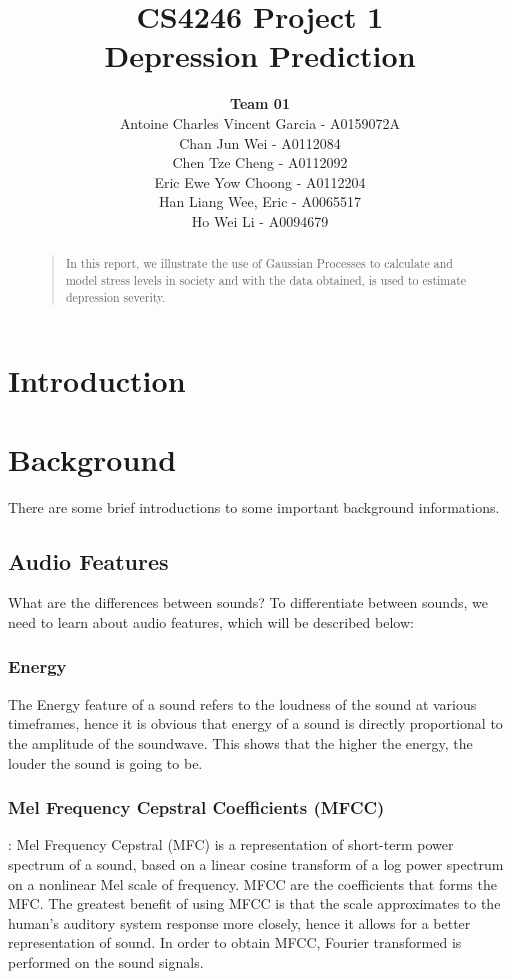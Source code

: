 \documentclass{article}
\title{
	CS4246 Project 1\\ Depression Prediction
}
\author{
	{\bf Team 01} \\
	Antoine Charles Vincent Garcia - A0159072A\\
	Chan Jun Wei - A0112084\\
	Chen Tze Cheng - A0112092\\
	Eric Ewe Yow Choong - A0112204\\
	Han Liang Wee, Eric - A0065517\\
	Ho Wei Li - A0094679\\
}
\begin{document}
 	\maketitle

	\begin{abstract}
	\begin{quote}
	In this report, we illustrate the use of Gaussian Processes to calculate and model stress levels in society and with the data obtained, is used to estimate depression severity.
	\end{quote}
	\end{abstract}
	
	\section{Introduction}

	\section{Background}
	There are some brief introductions to some important background informations.

	\subsection{Audio Features}
	What are the differences between sounds? To differentiate between sounds, we need to learn about audio features, which will be described below:
	
	\subsubsection{Energy}
	The Energy feature of a sound refers to the loudness of the sound at various timeframes, 
	hence it is obvious that energy of a sound is directly proportional to the amplitude of the soundwave. 
	This shows that the higher the energy, the louder the sound is going to be.	

	\subsubsection{Mel Frequency Cepstral Coefficients (MFCC)}: 
	Mel Frequency Cepstral (MFC) is a representation of short-term power spectrum of a sound, 
	based on a linear cosine transform of a log power spectrum on a nonlinear Mel scale of frequency. 
	MFCC are the coefficients that forms the MFC. The greatest benefit of using MFCC is that the scale approximates to the 
	human's auditory system response more closely, hence it allows for a better representation of sound. 
	In order to obtain MFCC, Fourier transformed is performed on the sound signals.	
\end{document}
